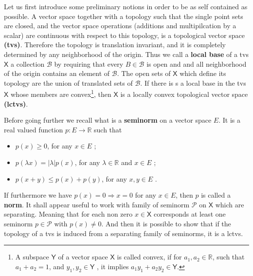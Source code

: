 \documentclass[10pt]{book}
\newcommand{\abs}[1]{\left|#1\right|}
\newcommand{\Bcal}{\mathcal{B}}
\newcommand{\Pcal}{\mathcal{P}}
\newcommand{\Rbb}{\mathbb{R}}
\newcommand{\Xsf}{\mathsf{X}}
\newcommand{\Ysf}{\mathsf{Y}}
\theoremstyle{break}
\begin{document}
\bigskip


Let us first introduce some preliminary notions in order to be as self contained as possible. A vector space together with a topology such that the single point sets are closed, and the vector space operations (additions and multipilcation by a scalar) are continuous with respect to this topology, is a topological vector space \textbf{(tvs)}. Therefore the topology is translation invariant, and it is completely determined by any neighborhood of the origin. Thus we call a \textbf{local base} of a tvs $\Xsf$ a collection $\Bcal$ by requiring that every $B\in\Bcal$ is open and and all neighborhood of the origin contains an element of $\Bcal$. The open sets of $\Xsf$ which define its topology are the union of translated sets of $\Bcal$. If there is s a local base in the tvs $\Xsf$ whose members are convex\footnote{A subspace $\Ysf$ of a vector space $\Xsf$ is called convex, if for $a_1, a_2 \in \Rbb$, such that $a_1 + a_2 = 1$, and $y_1, y_2 \in \Ysf$ , it implies $a_1 y_1 + a_2 y_2 \in \Ysf$.}, then $\Xsf$ is a locally convex topological vector space \textbf{(lctvs)}.

\bigskip


Before going further we recall what is a \textbf{seminorm} on a vector space $E$. It is a real valued function $p : E \to \Rbb$ such that
%
\begin{itemize}
\item $p(x) \geq 0$, for any $x \in E$ ;
\item $p(\lambda x) = \abs{\lambda} p(x)$, for any $\lambda \in \Rbb$ and $x \in E$ ;
\item $p(x+y) \leq p(x) + p(y)$, for any $x, y \in E$ .
\end{itemize}
%
If furthermore we have $p(x) = 0 \Rightarrow x = 0$ for any $x \in E$, then $p$ is called a \textbf{norm}. It shall appear useful to work with family of seminorm $\Pcal$ on $\Xsf$ which are separating. Meaning that for each non zero $x \in \Xsf$ corresponds at least one seminorm $p \in \Pcal$ with $p(x) \neq 0$. And then it is possible to show that if the topology of a tvs is induced from a separating family of seminorms, it is a lctvs. 


\bigskip
\end{document}
